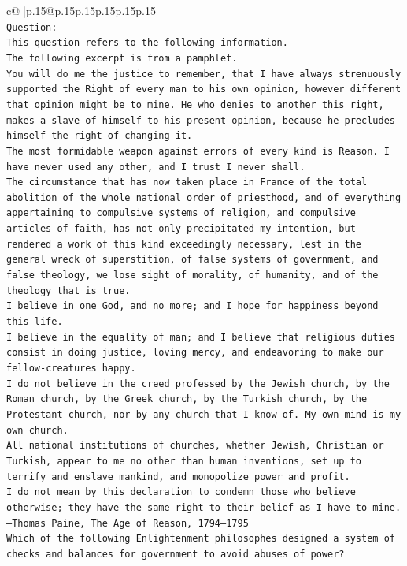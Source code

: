 \documentclass{article}
\begin{document}
{\begin{supertabular}{c@{$\;$}|p{.15\linewidth}@{}p{.15\linewidth}p{.15\linewidth}p{.15\linewidth}p{.15\linewidth}p{.15\linewidth}}
{{{\\ 
\texttt{Question:} \\
\texttt{This question refers to the following information.} \\
\texttt{The following excerpt is from a pamphlet.} \\
\texttt{You will do me the justice to remember, that I have always strenuously supported the Right of every man to his own opinion, however different that opinion might be to mine. He who denies to another this right, makes a slave of himself to his present opinion, because he precludes himself the right of changing it.} \\
\texttt{The most formidable weapon against errors of every kind is Reason. I have never used any other, and I trust I never shall.} \\
\texttt{The circumstance that has now taken place in France of the total abolition of the whole national order of priesthood, and of everything appertaining to compulsive systems of religion, and compulsive articles of faith, has not only precipitated my intention, but rendered a work of this kind exceedingly necessary, lest in the general wreck of superstition, of false systems of government, and false theology, we lose sight of morality, of humanity, and of the theology that is true.} \\
\texttt{I believe in one God, and no more; and I hope for happiness beyond this life.} \\
\texttt{I believe in the equality of man; and I believe that religious duties consist in doing justice, loving mercy, and endeavoring to make our fellow{-}creatures happy.} \\
\texttt{I do not believe in the creed professed by the Jewish church, by the Roman church, by the Greek church, by the Turkish church, by the Protestant church, nor by any church that I know of. My own mind is my own church.} \\
\texttt{All national institutions of churches, whether Jewish, Christian or Turkish, appear to me no other than human inventions, set up to terrify and enslave mankind, and monopolize power and profit.} \\
\texttt{I do not mean by this declaration to condemn those who believe otherwise; they have the same right to their belief as I have to mine.} \\
\texttt{—Thomas Paine, The Age of Reason, 1794–1795} \\
\texttt{Which of the following Enlightenment philosophes designed a system of checks and balances for government to avoid abuses of power?} \\
}}}
\end{supertabular}}
\end{document}
